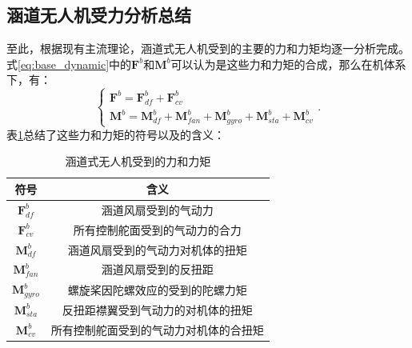 \subsection{涵道无人机受力分析总结}
至此，根据现有主流理论，涵道式无人机受到的主要的力和力矩均逐一分析完成。式\eqref{eq:base_dynamic}中的$\bm{F}^b$和$\bm{M}^b$可以认为是这些力和力矩的合成，那么在机体系下，有：
\begin{equation}
    \begin{cases}
        \bm{F}^b = \bm{F}_{df}^b + \bm{F}_{cv}^b \\
        \bm{M}^b = \bm{M}_{df}^b + \bm{M}_{fan}^b + \bm{M}_{gyro}^b + \bm{M}_{sta}^b + \bm{M}_{cv}^b
    \end{cases}.
\end{equation}
表\ref{tab:F_and_M}总结了这些力和力矩的符号以及的含义：
\begin{table}
    \caption{\label{tab:F_and_M}涵道式无人机受到的力和力矩}
    \centering{}%
    \begin{tabular}{cc}
    \toprule
    符号 & 含义\tabularnewline
    \midrule
    $\bm{F}_{df}^b$ & 涵道风扇受到的气动力\tabularnewline
    
    $\bm{F}_{cv}^b$ & 所有控制舵面受到的气动力的合力\tabularnewline

    $\bm{M}_{df}^b$ & 涵道风扇受到的气动力对机体的扭矩\tabularnewline

    $\bm{M}_{fan}^b$ & 涵道风扇受到的反扭距\tabularnewline

    $\bm{M}_{gyro}^b$ & 螺旋桨因陀螺效应的受到的陀螺力矩\tabularnewline

    $\bm{M}_{sta}^b$ & 反扭距襟翼受到气动力的对机体的扭矩\tabularnewline

    $\bm{M}_{cv}^b$ & 所有控制舵面受到的气动力对机体的合扭矩\tabularnewline
    \bottomrule
    \end{tabular}
\end{table}

